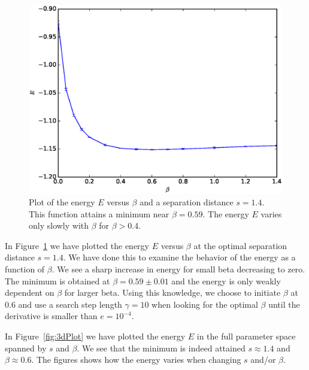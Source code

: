 \documentclass[twoside]{article}
\begin{document}
\begin{figure}
\centering
\includegraphics[width=0.8\linewidth]{figs/EvsBeta.eps}
\caption{Plot of the energy $E$ versus $\beta$ and a separation distance $s=1.4$. This function attains a minimum near $\beta = 0.59$. The energy $E$ varies only slowly with $\beta$ for $\beta>0.4$.}
\label{fig:EvsBeta}
\end{figure}

In Figure~\ref{fig:EvsBeta} we have plotted the energy $E$ versus $\beta$ at the optimal separation distance $s = 1.4$. We have done this to examine the behavior of the energy as a function of $\beta$. We see a sharp increase in energy for small beta decreasing to zero. The minimum is obtained at $\beta = 0.59 \pm 0.01$ and the energy is only weakly dependent on $\beta$ for larger beta. Using this knowledge, we choose to initiate $\beta$ at 0.6 and use a search step length $\gamma = 10$ when looking for the optimal $\beta$ until the derivative is smaller than $e = 10^{-4}$.

In Figure~\ref{fig:3dPlot} we have plotted the energy $E$ in the full parameter space spanned by $s$ and $\beta$. We see that the minimum is indeed attained $s \approx 1.4$ and $\beta \approx 0.6$. The figures shows how the energy varies when changing $s$ and/or $\beta$.
\end{document}
